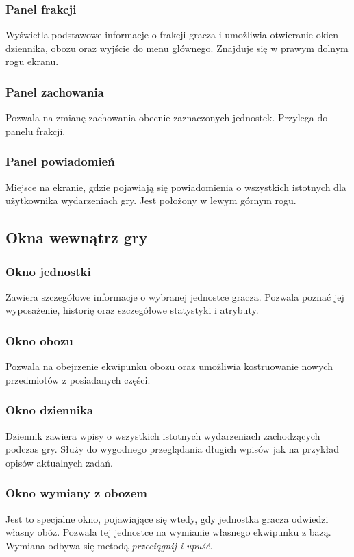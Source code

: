 \documentclass[licencjacka]{pracamgr}
\begin{document}
      \subsubsection{Panel frakcji}
      Wyświetla podstawowe informacje o frakcji gracza i umożliwia otwieranie okien dziennika, obozu oraz wyjście do menu głównego.
      Znajduje się w prawym dolnym rogu ekranu.
      \subsubsection{Panel zachowania}
      Pozwala na zmianę zachowania obecnie zaznaczonych jednostek. Przylega do panelu frakcji.
      \subsubsection{Panel powiadomień}
      Miejsce na ekranie, gdzie pojawiają się powiadomienia o wszystkich istotnych dla użytkownika wydarzeniach gry. Jest położony w lewym górnym rogu.

    \subsection{Okna wewnątrz gry}
      \subsubsection{Okno jednostki}
      Zawiera szczegółowe informacje o wybranej jednostce gracza. Pozwala poznać jej wyposażenie, historię oraz szczegółowe statystyki i atrybuty.
      \subsubsection{Okno obozu}
      Pozwala na obejrzenie ekwipunku obozu oraz umożliwia kostruowanie nowych przedmiotów z posiadanych części.
      \subsubsection{Okno dziennika}
      Dziennik zawiera wpisy o wszystkich istotnych wydarzeniach zachodzących podczas gry. Służy do wygodnego przeglądania długich wpisów jak na przykład
      opisów aktualnych zadań.
      \subsubsection{Okno wymiany z obozem}
      Jest to specjalne okno, pojawiające się wtedy, gdy jednostka gracza odwiedzi własny obóz. Pozwala tej jednostce na wymianie własnego ekwipunku z bazą.
      Wymiana odbywa się metodą \emph{przeciągnij i upuść}.
\end{document}
